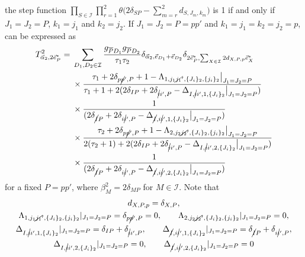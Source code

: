 \documentclass[10pt,a4paper]{amsart}
\numberwithin{equation}{section}
\begin{document}
the step function
$
\prod_{
S
\in
\mathcal{I}
}
\prod_{r=1}^{2}
\theta
\bigl(
 2
 \delta_{SP}
 -
 \sum_{m=r}^{2}
 d_{S,J_{m},k_{m}}
\bigr)
$
is 1 if and only if $J_{1}=J_{2}=P$, $k_{1}=j_{1}$ and $k_{2}=j_{2}$. If $J_{1}=J_{2}=P=pp'$ and $k_{1}=j_{1}=k_{2}=j_{2}=p$,  can be expressed as
\begin{align}
 T^{2}_{\vec{\alpha}_{2},2\vec{e}_{P}^{\ast}}
 ={}&
 \sum_{
 D_{1},
 D_{2}
 \in
 \mathcal{I}
 }
 \frac{
 g_{\overline{P}D_{1}}
 g_{\overline{P}D_{2}}
 }{
 \tau_{1}
 \tau_{2}
 }
 \delta_{
 \vec{\alpha}_{2},
 \vec{e}_{D_{1}}
 +
 \vec{e}_{D_{2}}
 }
 \delta_{
 2
 \vec{e}_{P}^{\ast},
 \sum_{
 X
 \in
 \mathcal{I}
 }
 2
 d_{
 X,
 P,
 p
 }
 \vec{e}_{X}^{\ast}
 }
 \nonumber
 \\
 &
 \times
 \frac{
 \tau_{1}
 +
 2
 \delta_{p\cancel{p}',P}
 +
 1
 -
 \Lambda_{
 1,
 j_{1}\cancel{j_{1}}',
 \{
 J_{i}
 \}_{2},
 \{
 j_{i}
 \}_{2}
 }
 \big|_{J_{1}=J_{2}=P}
 }{
 \tau_{1}+1
 +
 2
 (
 2
 \delta_{IP}
 +
 2
 \delta_{\cancel{i}i',P}
 -
 \Delta_{
 I,
 \cancel{i}i',
 1,
 \{
 J_{i}
 \}_{2}
 }
 \big|_{J_{1}=J_{2}=P}
 )
 }
 \nonumber
 \\
 &\times\frac{1}{ (
 2
 \delta_{\cancel{I}P}
 +
 2
 \delta_{i\cancel{i}',P}
 -
 \Delta_{
 \cancel{I},
 i\cancel{i}',
 1,
 \{
 J_{i}
 \}_{2}
 }
 \big|_{J_{1}=J_{2}=P}
 )}\nonumber\\
 &
 \times
 \frac{
 \tau_{2}
 +
 2
 \delta_{p\cancel{p}',P}
 +
 1
 -
 \Lambda_{
 2,
 j_{2}\cancel{j_{2}}',
 \{
 J_{i}
 \}_{2},
 \{
 j_{i}
 \}_{2}
 }
 \big|_{J_{1}=J_{2}=P}
 }{
 2
 (
 \tau_{2}+1
 )
 +
 2
 (
 2
 \delta_{IP}
 +
 2
 \delta_{\cancel{i}i',P}
 -
 \Delta_{
 I,
 \cancel{i}i',
 2,
 \{
 J_{i}
 \}_{2}
 }
 \big|_{J_{1}=J_{2}=P}
 )
 }
 \nonumber\\
 &\times\frac{1}{ (
 2
 \delta_{\cancel{I}P}
 +
 2
 \delta_{i\cancel{i}',P}
 -
 \Delta_{
 \cancel{I},
 i\cancel{i}',
 2,
 \{
 J_{i}
 \}_{2}
 }
 \big|_{J_{1}=J_{2}=P}
 )}\label{star_coeff_G24_n2_2P}
\end{align}
for a fixed $P=pp'$, where
$
\beta_{M}^{2}
=
2\delta_{MP}
$
for
$
M
\in
\mathcal{I}
$.
Note that
\begin{gather}
d_{
 X,
 P,
 p
}
=
\delta_{
 X,
 P
},
\label{d_calc_2}
\\
\Lambda_{
 1,
 j_{1}\cancel{j_{1}}',
 \{
 J_{i}
 \}_{2},
 \{
 j_{i}
 \}_{2}
}
|_{J_{1}=J_{2}=P}
=
\delta_{p\cancel{p}',P}
=
0
,
\qquad
\Lambda_{
 2,
 j_{2}\cancel{j_{2}}',
 \{
 J_{i}
 \}_{2},
 \{
 j_{i}
 \}_{2}
}
|_{J_{1}=J_{2}=P}
=
0,
\label{lambda_calc_1and2}
\\
\Delta_{
I,
\cancel{i}i',
1,
\{
 J_{i}
\}_{2}
}
|_{J_{1}=J_{2}=P}
=
\delta_{IP}
+
\delta_{\cancel{i}i',P},
\qquad
\Delta_{
\cancel{I},
i\cancel{i}',
1,
\{
 J_{i}
\}_{2}
}
|_{J_{1}=J_{2}=P}
=
\delta_{\cancel{I}P}
+
\delta_{i\cancel{i}',P},
\label{Delta_calc_1}
\\
\Delta_{
I,
\cancel{i}i',
2,
\{
 J_{i}
\}_{2}
}
|_{J_{1}=J_{2}=P}
=
0,
\qquad
\Delta_{
\cancel{I},
i\cancel{i}',
2,
\{
 J_{i}
\}_{2}
}
|_{J_{1}=J_{2}=P}
=
0
\label{Delta_calc_2}
\end{gather}
\end{document}
